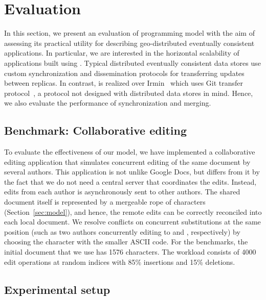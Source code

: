 \section{Evaluation}
\label{sec:evaluation}

In this section, we present an evaluation of \name programming model
with the aim of assessing its practical utility for describing
geo-distributed eventually consistent applications. In particular, we
are interested in the horizontal scalability of applications built
using \name. Typical distributed eventually consistent data stores use
custom synchronization and dissemination protocols for transferring
updates between replicas. In contrast, \name is realized over Irmin~\cite{Irmin}
which uses Git transfer protocol~\cite{..}, a protocol not designed
with distributed data stores in mind. Hence, we also evaluate the
performance of synchronization and merging.

\subsection{Benchmark: Collaborative editing}

To evaluate the effectiveness of our model, we have implemented a
collaborative editing application that simulates concurrent editing of
the same document by several authors. This application is not unlike
Google Docs, but differs from it by the fact that we do not need a
central server that coordinates the edits.  Instead, edits from each
author is asynchronously sent to other authors. The shared document
itself is represented by a mergeable rope of characters
(Section~\ref{sec:model}), and hence, the remote edits can be
correctly reconciled into each local document. We resolve conflicts on
concurrent substitutions at the same position (such as two authors
concurrently editing  to  and ,
respectively) by choosing the character with the smaller ASCII
code. For the benchmarks, the initial document that we use has 1576
characters. The workload consists of 4000 edit operations at random
indices with 85\% insertions and 15\% deletions.

\subsection{Experimental setup}

